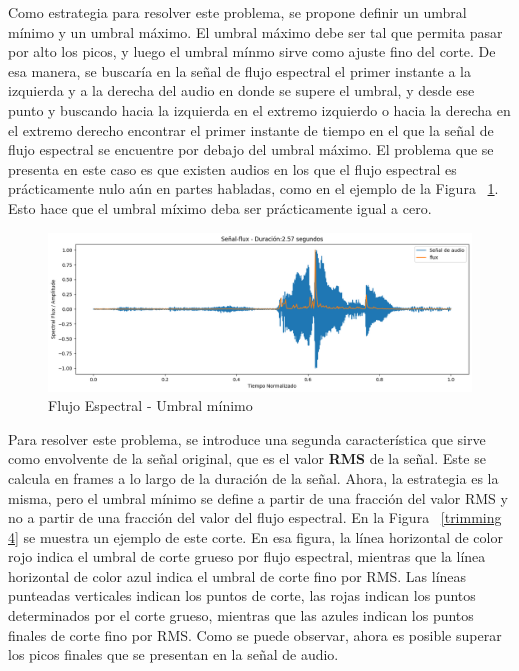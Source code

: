 \documentclass[a4paper, 12pt]{article}
\begin{document}
Como estrategia para resolver este problema, se propone definir un umbral mínimo y un umbral máximo. El umbral máximo debe ser tal que permita pasar por alto los picos, y luego el umbral mínmo sirve como ajuste fino del corte. De esa manera, se buscaría en la señal de flujo espectral el primer instante a la izquierda y a la derecha del audio en donde se supere el umbral, y desde ese punto y buscando hacia la izquierda en el extremo izquierdo o hacia la derecha en el extremo derecho encontrar el primer instante de tiempo en el que la señal de flujo espectral se encuentre por debajo del umbral máximo. El problema que se presenta en este caso es que existen audios en los que el flujo espectral es prácticamente nulo aún en partes habladas, como en el ejemplo de la Figura ~\ref{trimming 3}. Esto hace que el umbral míximo deba ser prácticamente igual a cero.

\begin{figure}[h]
    \centering
    \includegraphics[width=0.8\linewidth]{trimming3.png}
    \caption{Flujo Espectral - Umbral mínimo}
    \label{trimming 3}
\end{figure}

Para resolver este problema, se introduce una segunda característica que sirve como envolvente de la señal original, que es el valor \textbf{RMS} de la señal. Este se calcula en frames a lo largo de la duración de la señal. Ahora, la estrategia es la misma, pero el umbral mínimo se define a partir de una fracción del valor RMS y no a partir de una fracción del valor del flujo espectral. En la Figura ~\ref{trimming 4} se muestra un ejemplo de este corte. En esa figura, la línea horizontal de color rojo indica el umbral de corte grueso por flujo espectral, mientras que la línea horizontal de color azul indica el umbral de corte fino por RMS. Las líneas punteadas verticales indican los puntos de corte, las rojas indican los puntos determinados por el corte grueso, mientras que las azules indican los puntos finales de corte fino por RMS. Como se puede observar, ahora es posible superar los picos finales que se presentan en la señal de audio.
\end{document}
